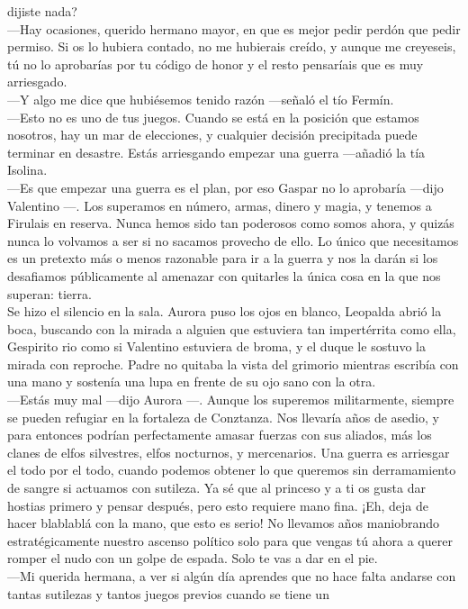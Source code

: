 \documentclass[
  letterpaper,
]{krantz}
\begin{document}
dijiste nada?\\
---Hay ocasiones, querido hermano mayor, en que es mejor pedir perdón
que pedir permiso. Si os lo hubiera contado, no me hubierais creído, y
aunque me creyeseis, tú no lo aprobarías por tu código de honor y el
resto pensaríais que es muy arriesgado.\\
---Y algo me dice que hubiésemos tenido razón ---señaló el tío Fermín.\\
---Esto no es uno de tus juegos. Cuando se está en la posición que
estamos nosotros, hay un mar de elecciones, y cualquier decisión
precipitada puede terminar en desastre. Estás arriesgando empezar una
guerra ---añadió la tía Isolina.\\
---Es que empezar una guerra es el plan, por eso Gaspar no lo aprobaría
---dijo Valentino ---. Los superamos en número, armas, dinero y magia, y
tenemos a Firulais en reserva. Nunca hemos sido tan poderosos como somos
ahora, y quizás nunca lo volvamos a ser si no sacamos provecho de ello.
Lo único que necesitamos es un pretexto más o menos razonable para ir a
la guerra y nos la darán si los desafiamos públicamente al amenazar con
quitarles la única cosa en la que nos superan: tierra. ~\\
Se hizo el silencio en la sala. Aurora puso los ojos en blanco, Leopalda
abrió la boca, buscando con la mirada a alguien que estuviera tan
impertérrita como ella, Gespirito rio como si Valentino estuviera de
broma, y el duque le sostuvo la mirada con reproche. Padre no quitaba la
vista del grimorio mientras escribía con una mano y sostenía una lupa en
frente de su ojo sano con la otra.\\
---Estás muy mal ---dijo Aurora ---. Aunque los superemos militarmente,
siempre se pueden refugiar en la fortaleza de Conztanza. Nos llevaría
años de asedio, y para entonces podrían perfectamente amasar fuerzas con
sus aliados, más los clanes de elfos silvestres, elfos nocturnos, y
mercenarios. Una guerra es arriesgar el todo por el todo, cuando podemos
obtener lo que queremos sin derramamiento de sangre si actuamos con
sutileza. Ya sé que al princeso y a ti os gusta dar hostias primero y
pensar después, pero esto requiere mano fina. ¡Eh, deja de hacer
blablablá con la mano, que esto es serio! No llevamos años maniobrando
estratégicamente nuestro ascenso político solo para que vengas tú ahora
a querer romper el nudo con un golpe de espada. Solo te vas a dar en el
pie.\\
---Mi querida hermana, a ver si algún día aprendes que no hace falta
andarse con tantas sutilezas y tantos juegos previos cuando se tiene un
\end{document}
